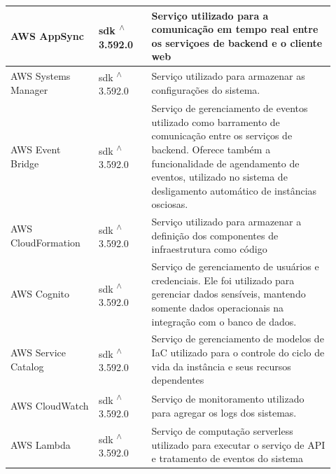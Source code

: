 \begin{longtable}{p{0.25\linewidth} p{0.15\linewidth} p{0.525\linewidth}}
\hline

AWS AppSync \citep{awsappsync} & sdk \textsuperscript{$\wedge$}3.592.0 & Serviço utilizado para a comunicação em tempo real entre os serviçoes de backend e o cliente web \\

\hline

AWS Systems Manager \citep{awssystemsmanagerdocs} & sdk \textsuperscript{$\wedge$}3.592.0 & Serviço utilizado para armazenar as configurações do sistema. \\

\hline

AWS Event Bridge \citep{awseventbridgedocs} & sdk \textsuperscript{$\wedge$}3.592.0 & Serviço de gerenciamento de eventos utilizado como barramento de comunicação entre os serviços de backend. Oferece também a funcionalidade de agendamento de eventos, utilizado no sistema de desligamento automático de instâncias osciosas. \\

\hline

AWS CloudFormation \citep{awscloudformationdocs} & sdk \textsuperscript{$\wedge$}3.592.0 & Serviço utilizado para armazenar a definição dos componentes de infraestrutura como código \\

\hline

AWS Cognito \citep{awscognito} & sdk \textsuperscript{$\wedge$}3.592.0 & Serviço de gerenciamento de usuários e credenciais. Ele foi utilizado para gerenciar dados sensíveis, mantendo somente dados operacionais na integração com o banco de dados. \\

\hline

AWS Service Catalog \citep{awsservicecatalogdocs} & sdk \textsuperscript{$\wedge$}3.592.0 & Serviço de gerenciamento de modelos de IaC utilizado para o controle do ciclo de vida da instância e seus recursos dependentes \\

\hline

AWS CloudWatch \citep{awscloudwatchdocs} & sdk \textsuperscript{$\wedge$}3.592.0 & Serviço de monitoramento utilizado para agregar os logs dos sistemas. \\

\hline

AWS Lambda \citep{awslambdadocs} & sdk \textsuperscript{$\wedge$}3.592.0 & Serviço de computação serverless utilizado para executar o serviço de API e tratamento de eventos do sistema \\


\end{longtable}
